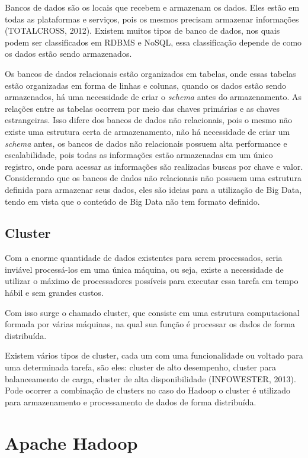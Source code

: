Bancos de dados são os locais que recebem e armazenam os dados. Eles estão em todas as plataformas e serviços, pois os mesmos precisam armazenar informações (TOTALCROSS, 2012). Existem muitos tipos de banco de dados, nos quais podem ser classificados em RDBMS e NoSQL, essa classificação depende de como os dados estão sendo armazenados.

Os bancos de dados relacionais estão organizados em tabelas, onde essas tabelas estão organizadas em forma de linhas e colunas, quando os dados estão sendo armazenados, há uma necessidade de criar o \textit{schema} antes do armazenamento. As relações entre as tabelas ocorrem por meio das chaves primárias e as chaves estrangeiras. Isso difere dos bancos de dados não relacionais, pois o mesmo não existe uma estrutura certa de armazenamento, não há necessidade de criar um \textit{schema} antes, os bancos de dados não relacionais possuem alta performance e escalabilidade, pois todas as informações estão armazenadas em um único registro, onde para acessar as informações são realizadas buscas por chave e valor. Considerando que os bancos de dados não relacionais não possuem uma estrutura definida para armazenar seus dados, eles são ideias para a utilização de Big Data, tendo em vista que o conteúdo de Big Data não tem formato definido.

\subsection{Cluster}

Com a enorme quantidade de dados existentes para serem processados, seria inviável processá-los em uma única máquina, ou seja, existe a necessidade de utilizar o máximo de processadores possíveis para executar essa tarefa em tempo hábil e sem grandes custos. 
	
Com isso surge o chamado cluster, que consiste em uma estrutura computacional formada por várias máquinas, na qual sua função é processar os dados de forma distribuída. 

Existem vários tipos de cluster, cada um com uma funcionalidade ou voltado para uma determinada tarefa, são eles: cluster de alto desempenho, cluster para balanceamento de carga, cluster de alta disponibilidade (INFOWESTER, 2013). Pode ocorrer a combinação de clusters no caso do Hadoop o cluster é utilizado para armazenamento e processamento de dados de forma distribuída.


\section{Apache Hadoop}
\label{Apache Hadoop}

